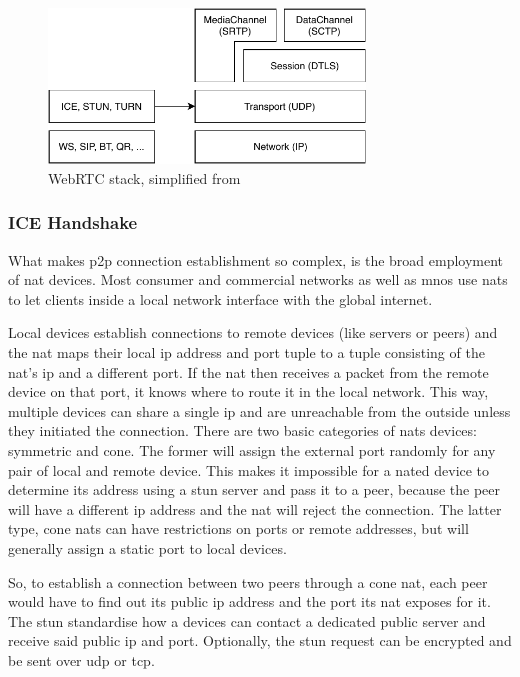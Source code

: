 \begin{figure}
\centering
\includegraphics[width=0.75\textwidth]{graphics/webrtc-proto.pdf}
\caption{WebRTC stack, simplified from \citet[p. 316, fig. 18.3]{high-performance-browser-networking}}
\label{fig:webrtc-proto}
\end{figure}

\subsubsection{ICE Handshake}
What makes \gls{p2p} connection establishment so complex, is the broad employment of \gls{nat} devices. Most consumer and commercial networks as well as \glspl{mno} use \glspl{nat} to let clients inside a local network interface with the global internet.

Local devices establish connections to remote devices (like servers or peers) and the \gls{nat} maps their local \gls{ip} address and port tuple to a tuple consisting of the \gls{nat}'s \gls{ip} and a different port. If the \gls{nat} then receives a packet from the remote device on that port, it knows where to route it in the local network. This way, multiple devices can share a single \gls{ip} and are unreachable from the outside unless they initiated the connection. There are two basic categories of \glspl{nat} devices: symmetric and cone. The former will assign the external port randomly for any pair of local and remote device. This makes it impossible for a \gls{nat}ed device to determine its address using a stun server and pass it to a peer, because the peer will have a different \gls{ip} address and the \gls{nat} will reject the connection. The latter type, cone \glspl{nat} can have restrictions on ports or remote addresses, but will generally assign a static port to local devices.

So, to establish a connection between two peers through a cone \gls{nat}, each peer would have to find out its public \gls{ip} address and the port its \gls{nat} exposes for it. The \gls{stun} standardise how a devices can contact a dedicated public server and receive said public \gls{ip} and port. Optionally, the \gls{stun} request can be encrypted and be sent over \gls{udp} or \gls{tcp}.

